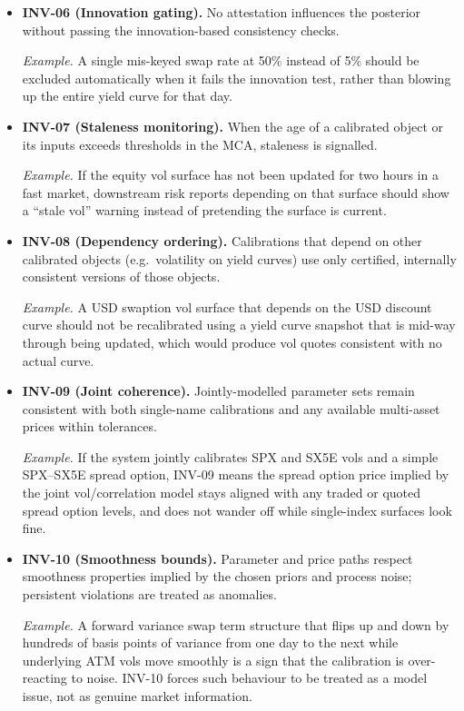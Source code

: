 \documentclass[11pt,a4paper]{article}
\begin{document}
\begin{itemize}
    \item \textbf{INV-06 (Innovation gating).} No attestation influences the posterior without passing the innovation-based consistency checks.

    \textit{Example.} A single mis-keyed swap rate at 50\% instead of 5\% should be excluded automatically when it fails the innovation test, rather than blowing up the entire yield curve for that day.

    \item \textbf{INV-07 (Staleness monitoring).} When the age of a calibrated object or its inputs exceeds thresholds in the MCA, staleness is signalled.

    \textit{Example.} If the equity vol surface has not been updated for two hours in a fast market, downstream risk reports depending on that surface should show a ``stale vol'' warning instead of pretending the surface is current.

    \item \textbf{INV-08 (Dependency ordering).} Calibrations that depend on other calibrated objects (e.g.\ volatility on yield curves) use only certified, internally consistent versions of those objects.

    \textit{Example.} A USD swaption vol surface that depends on the USD discount curve should not be recalibrated using a yield curve snapshot that is mid-way through being updated, which would produce vol quotes consistent with no actual curve.

    \item \textbf{INV-09 (Joint coherence).} Jointly-modelled parameter sets remain consistent with both single-name calibrations and any available multi-asset prices within tolerances.

    \textit{Example.} If the system jointly calibrates SPX and SX5E vols and a simple SPX--SX5E spread option, INV-09 means the spread option price implied by the joint vol/correlation model stays aligned with any traded or quoted spread option levels, and does not wander off while single-index surfaces look fine.

    \item \textbf{INV-10 (Smoothness bounds).} Parameter and price paths respect smoothness properties implied by the chosen priors and process noise; persistent violations are treated as anomalies.

    \textit{Example.} A forward variance swap term structure that flips up and down by hundreds of basis points of variance from one day to the next while underlying ATM vols move smoothly is a sign that the calibration is over-reacting to noise. INV-10 forces such behaviour to be treated as a model issue, not as genuine market information.
\end{itemize}
\end{document}
